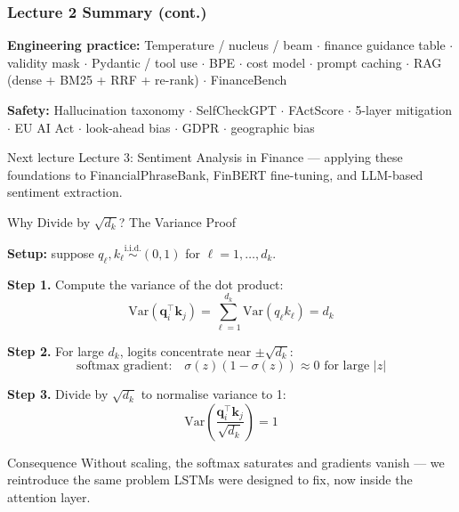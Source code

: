\documentclass[9pt,t]{beamer}
\begin{document}
\begin{frame}
\frametitle{Lecture 2 Summary (cont.)}

\textbf{Engineering practice:}
Temperature / nucleus / beam $\cdot$ finance guidance table $\cdot$ validity mask $\cdot$ Pydantic / tool use $\cdot$ BPE $\cdot$ cost model $\cdot$ prompt caching $\cdot$ RAG (dense + BM25 + RRF + re-rank) $\cdot$ FinanceBench

\textbf{Safety:}
Hallucination taxonomy $\cdot$ SelfCheckGPT $\cdot$ FActScore $\cdot$ 5-layer mitigation $\cdot$ EU AI Act $\cdot$ look-ahead bias $\cdot$ GDPR $\cdot$ geographic bias

\medskip
\begin{block}{Next lecture}
Lecture 3: Sentiment Analysis in Finance --- applying these foundations to
FinancialPhraseBank, FinBERT fine-tuning, and LLM-based sentiment extraction.
\end{block}
\end{frame}


\begin{frame}[noframenumbering]{Why Divide by $\sqrt{d_k}$? The Variance Proof}

\textbf{Setup:} suppose $q_\ell, k_\ell \overset{\text{i.i.d.}}{\sim} (0,1)$ for $\ell = 1,\ldots,d_k$.

\medskip
\textbf{Step 1.} Compute the variance of the dot product:
\[
\text{Var}\!\left(\mathbf{q}_i^\top \mathbf{k}_j\right) = \sum_{\ell=1}^{d_k} \text{Var}(q_\ell k_\ell) = d_k
\]

\textbf{Step 2.} For large $d_k$, logits concentrate near $\pm\sqrt{d_k}$:
\[
\text{softmax gradient:}\quad \sigma(z)(1-\sigma(z)) \approx 0 \text{ for large } |z|
\]

\textbf{Step 3.} Divide by $\sqrt{d_k}$ to normalise variance to 1:
\[
\text{Var}\!\left(\frac{\mathbf{q}_i^\top \mathbf{k}_j}{\sqrt{d_k}}\right) = 1
\]

\begin{block}{Consequence}
Without scaling, the softmax saturates and gradients vanish — we reintroduce the
same problem LSTMs were designed to fix, now inside the attention layer.
\end{block}
\end{frame}
\end{document}
